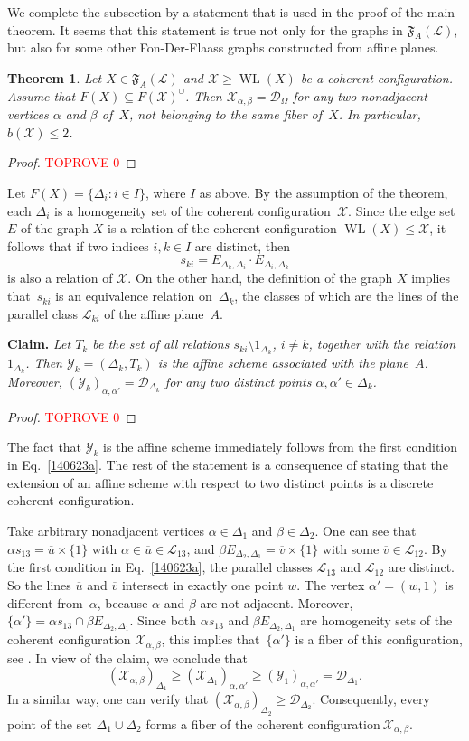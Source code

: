 \documentclass{amsart}
\newcommand{\cal}{\mathcal}
\newtheorem{theorem}[formula]{Theorem}
\def\thrml#1{\begin{theorem}\label{#1}}
\def\ethrm{\end{theorem}}
\def\prf{\begin{proof}\textcolor{red}{TOPROVE 0}\end{proof}}
\def\cD{{\cal D}}
\def\cL{{\cal L}}
\def\cX{{\cal X}}
\def\cY{{\cal Y}}
\def\fF{{\mathfrak F}}
\DeclareMathOperator{\WL}{WL}
\def\ov{\overline}
\begin{document}
We complete the subsection by a statement that is used in the proof of the main theorem. It seems that this statement is true not only for the 
graphs in $\fF_A(\cL)$, but also for some other Fon-Der-Flaass 
graphs constructed from affine planes.

\thrml{050623c}
Let $X\in \fF_A(\cL)$ and $\cX\ge \WL(X)$ be a coherent configuration. Assume that  $F(X)\subseteq F(\cX)^\cup$. Then $\cX_{\alpha,\beta}=\cD_\Omega$ for any two  nonadjacent vertices $\alpha$ and $\beta$ of~$X$, not belonging to the same fiber of~$X$. In particular, $b(\cX)\le 2$.
\ethrm
\prf
Let $F(X)=\{\Delta_i\colon i\in I\}$, where $I$ as above. By the assumption of the theorem, each $\Delta_i$ is a homogeneity set of 
the coherent configuration~$\cX$. Since the edge set $E$ of the graph 
$X$ is a relation of the coherent configuration $\WL(X)\le\cX$, 
it follows that if  two indices $i,k\in I$ are distinct, 
then 
$$
s_{ki}=E_{\Delta_k,\Delta_i}\cdot E_{\Delta_i,\Delta_k}
$$ 
is also a relation of  $\cX$. On the other hand, the definition of the graph $X$ implies that~$s_{ki}$ is an equivalence relation on~$\Delta_k$, the classes of which are the lines of the parallel class $\cL_{ki}$ of the affine plane~$A$. \medskip

{\bf Claim. }{\it  Let $T_k$ be the set of all relations $s_{ki}\setminus 1_{\Delta_k}$, $i\ne k$, together with the relation~$1_{\Delta_k}$.  Then  $\cY_k=(\Delta_k,T_k)$ is  the affine scheme associated with 
the plane~$A$.  Moreover, $(\cY_k)_{\alpha,\alpha'}=\cD_{\Delta_k}$ 
for any two distinct points $\alpha,\alpha'\in \Delta_k$.}
\prf
The fact that $\cY_k$ is the affine scheme immediately follows from the first condition in Eq.~\eqref{140623a}. The rest of the statement is a consequence of \cite[Theorem~3.3.8]{CP2019} stating that the extension of an affine scheme with respect to two distinct points is a discrete coherent configuration.
\eprf

Take arbitrary nonadjacent vertices $\alpha\in\Delta_1$ and $\beta\in\Delta_2$. One can see that $\alpha s_{13}=\ov u\times\{1\}$ with $\alpha\in \ov u\in\cL_{13}$, and  $\beta E_{\Delta_2,\Delta_1}=\ov v\times\{1\}$ with some $\ov v\in\cL_{12}$.  By the first condition in Eq.~\eqref{140623a}, the parallel classes $\cL_{13}$ and $\cL_{12}$ are distinct. So  the lines $\ov u$ and $\ov v$ intersect in exactly one point $w$. The vertex $\alpha'=(w,1)$ is different from~$\alpha$, because $\alpha$ and $\beta$ are not adjacent. Moreover,  $\{\alpha'\} = \alpha s_{13} \cap \beta E_{\Delta_2,\Delta_1}$. Since both $\alpha s_{13}$ and $\beta E_{\Delta_2,\Delta_1}$ are homogeneity sets  of the coherent configuration $\cX_{\alpha,\beta}$, this implies that~$\{\alpha'\}$ is a fiber of this configuration, see \cite[Lemma 3.3.5]{CP2019}. In view of the claim, we conclude that
$$
(\cX_{\alpha,\beta})_{\Delta_1}\ge (\cX_{\Delta_1})_{\alpha,\alpha'}\ge(\cY_1)_{\alpha,\alpha'}=\cD_{\Delta_1}.
$$
In a similar way, one can verify that $(\cX_{\alpha,\beta})_{\Delta_2}\ge \cD_{\Delta_2}$.  Consequently, every point of the set $\Delta_1\cup\Delta_2$ forms a fiber of the coherent configuration$~\cX_{\alpha,\beta}$.
\end{document}

